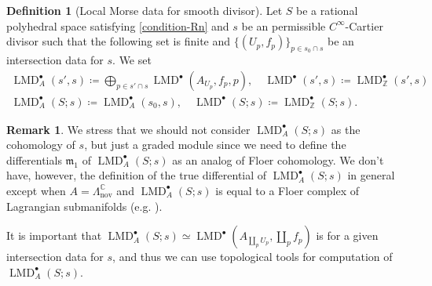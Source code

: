 \documentclass[a4paper,dvipdfmx,reqno,12pt]{amsart}
\theoremstyle{definition}
\newtheorem{definition}[theorem]{Definition}
\newtheorem{remark}[theorem]{Remark}
\newcommand{\deq}{\coloneqq}
\newcommand{\opn}[1]{\operatorname{#1}}
\numberwithin{equation}{section}
\begin{document}
\begin{definition}[{Local Morse data for smooth divisor}]
\label{definition-local-morse-data-divisor}
Let $S$ be a rational polyhedral space 
satisfying \cref{condition-Rn} and 
$s$ be an permissible $C^{\infty}$-Cartier divisor such that
the following set is finite and 
$\{(U_p,f_p)\}_{p\in s_0\cap s}$ 
be an intersection data for $s$.
We set
\begin{align}
\opn{LMD}^{\bullet}_{A}(s',s)\deq 
\bigoplus_{p\in s' \cap s} 
\opn{LMD}^{\bullet}(A_{U_p},f_{p},p), \quad 
\opn{LMD}^{\bullet}(s',s)
\deq \opn{LMD}^{\bullet}_{\mathbb{Z}}(s',s)\\
\opn{LMD}^{\bullet}_A(S;s)
\deq \opn{LMD}^{\bullet}_{A}(s_0,s), \quad
\opn{LMD}^{\bullet}(S;s)\deq
\opn{LMD}^{\bullet}_{\mathbb{Z}}(S;s).
\end{align}
\end{definition}

\begin{remark}
\label{remark-differential-graded-module}
We stress that we should not consider 
$\opn{LMD}^{\bullet}_{A}(S;s)$ as the cohomology of $s$,
but just
a graded module 
since we need to define the differentials 
$\mathfrak{m}_1$ of 
$\opn{LMD}^{\bullet}_{A}(S;s)$ as an analog of
Floer cohomology. We don't have, however,
the definition of the true differential of 
$\opn{LMD}^{\bullet}_A(S;s)$ in general except when 
$A=\Lambda_{\mathrm{nov}}^{\mathbb{C}}$ and
$\opn{LMD}^{\bullet}_{A}(S;s)$ is equal to a Floer complex
of Lagrangian submanifolds (e.g. \cite[5.2]{MR1882331}).
\end{remark}

It is important that 
$\opn{LMD}^{\bullet}_{A}(S;s)\simeq \opn{LMD}^{\bullet}(A_{\coprod_{p} U_p},\coprod_p f_p)$ is
for a given intersection data for $s$, and thus
we can use topological tools for computation of 
$\opn{LMD}^{\bullet}_{A}(S;s)$.
\end{document}
